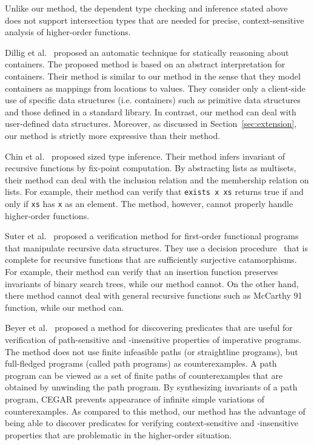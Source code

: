 Unlike our method, the dependent type checking and inference stated
above~\cite{Rondon2008,Kawaguchi2009,Unno2009} does not support
intersection types that are needed for precise, context-sensitive
analysis of higher-order functions.

Dillig et al.~\cite{Dillig2011} proposed an automatic technique for
statically reasoning about containers.  The proposed method is based on
an abstract interpretation for containers.  Their method is similar to
our method in the sense that they model containers as mappings from
locations to values.  They consider only a client-side use of specific
data structures (i.e. containers) such as primitive data structures and
those defined in a standard library.  In contrast, our method can deal
with user-defined data structures.  Moreover, as discussed in
Section~\ref{sec:extension}, our method is strictly more expressive than
their method.

Chin et al.~\cite{Chin2003} proposed sized type inference.  Their
method infers invariant of recursive functions by fix-point computation.
By abstracting lists as multisets, their method can deal with the
inclusion relation and the membership relation on lists.  For example, their method
can verify that \texttt{exists x xs} returns true if and only if
\texttt{xs} has \texttt{x} as an element.  The method, however, cannot
properly handle higher-order functions.

Suter et al.~\cite{Suter2011} proposed a verification method for
first-order functional programs that manipulate recursive data
structures.  They use a decision procedure~\cite{Suter2010} that is
complete for recursive functions that are sufficiently surjective
catamorphisms.  For example, their method can verify that an insertion
function preserves invariants of binary search trees, while our method
cannot.  On the other hand, there method cannot deal with general
recursive functions such as McCarthy 91 function, while our method can.

Beyer et al.~\cite{Beyer2007} proposed a method for discovering
predicates that are useful for verification of path-sensitive and
-insensitive properties of imperative programs.  The method does not use
finite infeasible paths (or straightline programs), but full-fledged
programs (called path programs) as counterexamples.  A path program can
be viewed as a set of finite paths of counterexamples that are obtained
by unwinding the path program.  By synthesizing invariants of a path
program, CEGAR prevents appearance of infinite simple variations of
counterexamples.  As compared to this method, our method has the
advantage of being able to discover predicates for verifying
context-sensitive and -insensitive properties that are problematic in
the higher-order situation.

